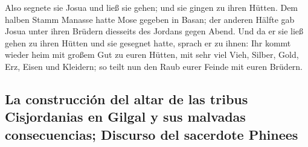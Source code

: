  Also segnete sie Josua und ließ sie gehen; und sie gingen
zu ihren Hütten.  Dem halben Stamm Manasse hatte Mose
gegeben in Basan; der anderen Hälfte gab Josua unter ihren Brüdern
diesseits des Jordans gegen Abend. Und da er sie ließ gehen zu ihren
Hütten und sie gesegnet hatte,  sprach er zu ihnen: Ihr
kommt wieder heim mit großem Gut zu euren Hütten, mit sehr viel Vieh,
Silber, Gold, Erz, Eisen und Kleidern; so teilt nun den Raub eurer
Feinde mit euren Brüdern.

\hypertarget{la-construcciuxf3n-del-altar-de-las-tribus-cisjordanias-en-gilgal-y-sus-malvadas-consecuencias-discurso-del-sacerdote-phinees}{%
\subsection{La construcción del altar de las tribus Cisjordanias en
Gilgal y sus malvadas consecuencias; Discurso del sacerdote
Phinees}\label{la-construcciuxf3n-del-altar-de-las-tribus-cisjordanias-en-gilgal-y-sus-malvadas-consecuencias-discurso-del-sacerdote-phinees}}

